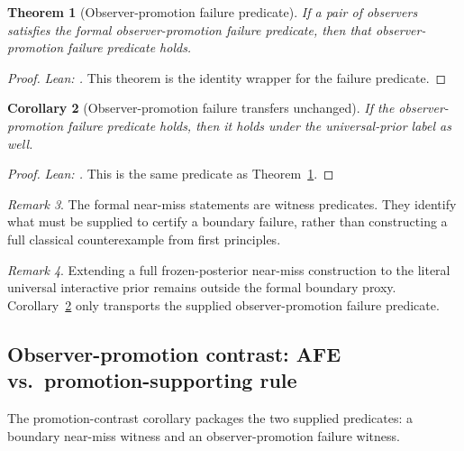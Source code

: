 \documentclass[11pt]{article}
\newtheorem{theorem}{Theorem}[section]
\newtheorem{corollary}[theorem]{Corollary}
\theoremstyle{definition}
\theoremstyle{remark}
\newtheorem{remark}[theorem]{Remark}
\theoremstyle{plain}
\theoremstyle{definition}
\begin{document}
\begin{theorem}[Observer-promotion failure predicate]
\label{thm:observer-promotion-failure}
If a pair of observers satisfies the formal observer-promotion failure predicate, then that observer-promotion failure predicate holds.
\end{theorem}

\begin{proof}
\noindent\emph{Lean: .}
This theorem is the identity wrapper for the failure predicate.
\end{proof}

\begin{corollary}[Observer-promotion failure transfers unchanged]
\label{cor:observer-promotion-universal}
If the observer-promotion failure predicate holds, then it holds under the universal-prior label as well.
\end{corollary}

\begin{proof}
\noindent\emph{Lean: .}
This is the same predicate as Theorem~\ref{thm:observer-promotion-failure}.
\end{proof}

\begin{remark}
\label{rem:near-miss}
The formal near-miss statements are witness predicates. They identify what must be supplied to certify a boundary failure, rather than constructing a full classical counterexample from first principles.
\end{remark}

\begin{remark}
\label{rem:near-miss-universal}
Extending a full frozen-posterior near-miss construction to the literal universal interactive prior remains outside the formal boundary proxy. Corollary~\ref{cor:observer-promotion-universal} only transports the supplied observer-promotion failure predicate.
\end{remark}

\subsection{Observer-promotion contrast: AFE vs.\ promotion-supporting rule}
\label{sec:promotion-contrast}

The promotion-contrast corollary packages the two supplied predicates: a boundary near-miss witness and an observer-promotion failure witness.
\end{document}

